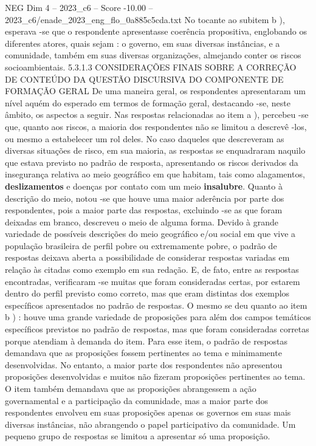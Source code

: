 \begin{textsample}{NEG Dim 4 – 2023\_c6 – Score -10.00 – 2023\_c6/enade\_2023\_eng\_flo\_0a885c5cda.txt}
No tocante ao subitem b ), esperava -se que o respondente apresentasse coerência propositiva, englobando os diferentes atores, quais sejam : o governo, em suas diversas instâncias, e a comunidade, também em suas diversas organizações, almejando conter os riscos socioambientais. 5.3.1.3 CONSIDERAÇÕES FINAIS SOBRE A CORREÇÃO DE CONTEÚDO DA QUESTÃO DISCURSIVA DO COMPONENTE DE FORMAÇÃO GERAL De uma maneira geral, os respondentes apresentaram um nível aquém do esperado em termos de formação geral, destacando -se, neste âmbito, os aspectos a seguir.
Nas respostas relacionadas ao item a ), percebeu -se que, quanto aos riscos, a maioria dos respondentes não se limitou a descrevê -los, ou mesmo a estabelecer um rol deles.
No caso daqueles que descreveram as diversas situações de risco, em sua maioria, as respostas se enquadraram naquilo que estava previsto no padrão de resposta, apresentando os riscos derivados da insegurança relativa ao meio geográfico em que habitam, tais como alagamentos, \textbf{deslizamentos} e doenças por contato com um meio \textbf{insalubre}.
Quanto à descrição do meio, notou -se que houve uma maior aderência por parte dos respondentes, pois a maior parte das respostas, excluindo -se as que foram deixadas em branco, descreveu o meio de alguma forma.
Devido à grande variedade de possíveis descrições do meio geográfico e/ou social em que vive a população brasileira de perfil pobre ou extremamente pobre, o padrão de respostas deixava aberta a possibilidade de considerar respostas variadas em relação às citadas como exemplo em sua redação.
E, de fato, entre as respostas encontradas, verificaram -se muitas que foram consideradas certas, por estarem dentro do perfil previsto como correto, mas que eram distintas dos exemplos específicos apresentados no padrão de respostas.
O mesmo se deu quanto ao item b ) : houve uma grande variedade de proposições para além dos campos temáticos específicos previstos no padrão de respostas, mas que foram consideradas corretas porque atendiam à demanda do item.
Para esse item, o padrão de respostas demandava que as proposições fossem pertinentes ao tema e minimamente desenvolvidas.
No entanto, a maior parte dos respondentes não apresentou proposições desenvolvidas e muitos não fizeram proposições pertinentes ao tema.
O item também demandava que as proposições abrangessem a ação governamental e a participação da comunidade, mas a maior parte dos respondentes envolveu em suas proposições apenas os governos em suas mais diversas instâncias, não abrangendo o papel participativo da comunidade.
Um pequeno grupo de respostas se limitou a apresentar só uma proposição.

\end{textsample}
